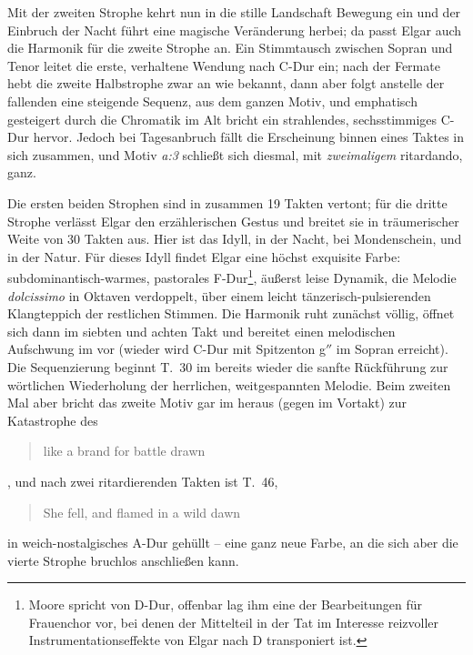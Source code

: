 \documentclass[a4paper,11pt,open=any]{scrbook}
\newcommand{\engquote}[1]{\foreignblockquote{english}{#1}}
\begin{document}
Mit der zweiten Strophe kehrt nun in die stille Landschaft Bewegung ein
und der Einbruch der Nacht führt eine magische Veränderung herbei; da passt
Elgar auch die Harmonik für die zweite Strophe an.  Ein Stimmtausch zwischen
Sopran und Tenor leitet die erste, verhaltene Wendung nach C-Dur ein; nach
der Fermate hebt die zweite Halbstrophe zwar an wie bekannt, dann aber folgt
anstelle der fallenden eine steigende Sequenz, aus dem ganzen Motiv, und
emphatisch gesteigert durch die Chromatik im Alt bricht ein strahlendes,
sechsstimmiges C-Dur hervor.  Jedoch bei Tagesanbruch fällt die Erscheinung
binnen eines Taktes in sich zusammen, und Motiv \textit{a:3} schließt sich
diesmal, mit \emph{zweimaligem} ritardando, ganz.

Die ersten beiden Strophen sind in zusammen 19 Takten vertont; für die
dritte Strophe verlässt Elgar den erzählerischen Gestus und breitet sie
in träumerischer Weite von 30 Takten aus.  Hier ist das Idyll, in der Nacht,
bei Mondenschein, und in der Natur.  Für dieses Idyll findet Elgar eine
höchst exquisite Farbe: subdominantisch-warmes, pastorales F-Dur\footnote{Moore
\parencite[S.~142]{moore} spricht von D-Dur, offenbar lag ihm eine der
Bearbeitungen für Frauenchor vor, bei denen der Mittelteil in der Tat im
Interesse reizvoller Instrumentationseffekte von Elgar nach D transponiert
ist.}, äußerst leise Dynamik, die Melodie \textit{dolcissimo}
in Oktaven verdoppelt, über einem leicht tänzerisch-pulsierenden Klangteppich
der restlichen Stimmen.  Die Harmonik ruht zunächst völlig, öffnet sich dann
im siebten und achten Takt und bereitet einen melodischen Aufschwung im
 vor (wieder wird C-Dur mit Spitzenton \textsf{g}$''$ im
Sopran erreicht).  Die Sequenzierung beginnt T.~30 im 
bereits wieder die sanfte Rückführung zur wörtlichen Wiederholung der
herrlichen, weitgespannten Melodie.  Beim zweiten Mal aber bricht das
zweite Motiv gar im  heraus (gegen  im
Vortakt) zur Katastrophe des \engquote{like a brand for battle drawn}, und
nach zwei ritardierenden Takten ist T.~46, \engquote{She fell, and flamed
in a wild dawn} in weich-nostalgisches A-Dur gehüllt – eine ganz neue
Farbe, an die sich aber die vierte Strophe bruchlos anschließen kann.
\end{document}
